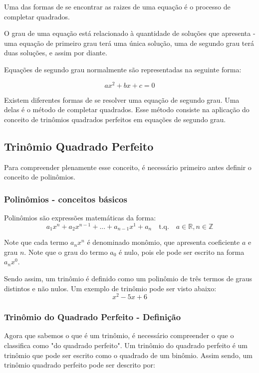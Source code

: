 \documentclass[../resumo.tex]{subfiles}
\begin{document}
	Uma das formas de se encontrar as raizes de uma equação é o processo de completar quadrados.

	O grau de uma equação está relacionado à quantidade de soluções que apresenta - uma equação
	de primeiro grau terá uma única solução, uma de segundo grau terá duas soluções, e assim por diante.

	Equações de segundo grau normalmente são representadas na seguinte forma:

	\[ ax^2 + bx + c = 0 \]

	Existem diferentes formas de se resolver uma equação de segundo grau. Uma delas é o método de 
	completar quadrados. Esse método consiste na aplicação do conceito de trinômios quadrados
	perfeitos em equações de segundo grau.

	\subsection{Trinômio Quadrado Perfeito}

	Para compreender plenamente esse conceito, é necessário primeiro antes definir o conceito de polinômios.

	\subsubsection{Polinômios - conceitos básicos}

	Polinômios são expressões matemáticas da forma:
	\[a_1x^n + a_2x^{n-1} + ... + a_{n-1}x^1 + a_n \quad \textrm{t.q.} \quad a \in \mathbb{R}, n \in \mathbb{Z}\]

	Note que cada termo \(a_nx^n\) é denominado monômio, que apresenta coeficiente \(a\) e grau \(n\).
	Note que o grau do termo \(a_0\) é nulo, pois ele pode ser escrito na forma \(a_nx^0\).

	Sendo assim, um trinômio é definido como um polinômio de três termos de graus distintos e não nulos. Um exemplo de
	trinômio pode ser visto abaixo:
	\[x^2 - 5x + 6\]

	\subsubsection{Trinômio do Quadrado Perfeito - Definição}

	Agora que sabemos o que é um trinômio, é necessário compreender o que o classifica como "do 
	quadrado perfeito". Um trinômio do quadrado perfeito é um trinômio que pode ser escrito
	como o quadrado de um binômio. Assim sendo, um trinômio quadrado perfeito pode ser descrito por:
\end{document}
